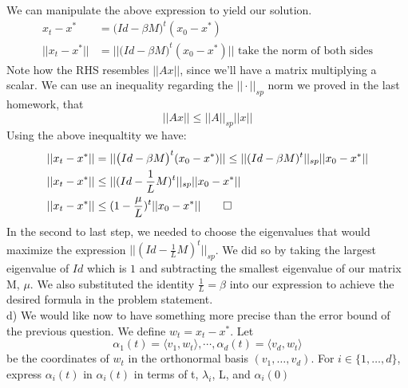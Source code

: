 \documentclass[12pt,twoside]{article}
\newcommand{\Id}{Id}
\begin{document}
			
We can manipulate the above expression to yield our solution.
\begin{equation}
    \begin{split} 
        	x_{t} - x^* &= \big(\Id - \beta M \big)^t(x_0 - x^*) \\
        ||x_{t} - x^*|| &= ||\big(\Id - \beta M \big)^t(x_0 - x^*)||	\text{ take the norm of both sides}
    \end{split}
\end{equation}
Note how the RHS resembles $||Ax||$, since we'll have a matrix multiplying a scalar. We can use an inequality regarding the $||\cdot||_{sp}$ norm we proved in the last homework, that $$||Ax|| \leq ||A||_{sp}||x|| $$ 
Using the above inequaltity we have:
\begin{equation}
    \begin{split} 
        ||x_{t} - x^*|| &= ||\big(\Id - \beta M \big)^t(x_0 - x^*)|| \leq ||(\Id - \beta M )^t ||_{sp} || x_0 - x^* ||\\
        ||x_{t} - x^*|| &\leq ||(\Id - \frac{1}{L} M )^t ||_{sp} || x_0 - x^* ||\\
        ||x_{t} - x^*|| &\leq (1 - \frac{\mu}{L} )^t || x_0 - x^* || \qed
    \end{split}
\end{equation}
In the second to last step, we needed to choose the eigenvalues that would maximize the expression $ ||(\Id - \frac{1}{L} M )^t ||_{sp}$. We did so by taking the largest eigenvalue of $\Id$ which is $1$ and subtracting the smallest eigenvalue of our matrix M, $\mu$. We also substituted the identity $\frac{1}{L}=\beta$ into our expression to achieve the desired formula in the problem statement.\\

d) We would like now to have something more precise than the error bound of the previous question. We define $w_t = x_t -x^*$. Let 
			$$
			\alpha_1(t) = \langle v_1, w_t \rangle, \cdots, \alpha_d(t) = \langle v_d, w_t \rangle
			$$
			be the coordinates of $w_t$ in the orthonormal basis $(v_1, \dots, v_d)$.
			For $i \in \{1, \dots, d\}$, express $\alpha_i(t)$ in $\alpha_i(t)$ in terms of t, $\lambda_i$, L, and $\alpha_i(0)$\\
\end{document}
